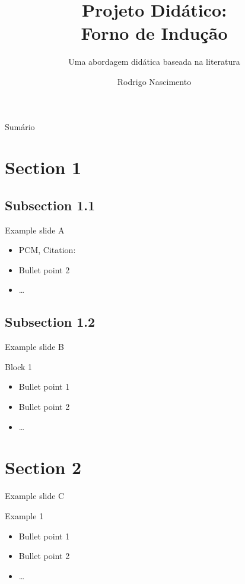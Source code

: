 \documentclass[18pt]{beamer}
\title[Short title]{Projeto Didático:\\ Forno de Indução}
\subtitle{Uma abordagem didática baseada na literatura}
\author{Rodrigo Nascimento}
\institute{Instrumentação para o Ensino de Física II}
\begin{document}

	\begin{frame}
		\titlepage
	\end{frame}

	\begin{frame}{Sumário}
		\tableofcontents
	\end{frame}

	\section{Section 1}
	\subsection{Subsection 1.1}
	\begin{frame}{Example slide A}
		\begin{itemize}
			\item PCM, Citation: \cite{becker2008a} %
			\pause
			\item Bullet point 2
			\item \dots
		\end{itemize}
	\end{frame}

	\subsection{Subsection 1.2}
	\begin{frame}{Example slide B}
		\begin{block}{Block 1}
			\begin{itemize}
				\item Bullet point 1
				\pause
				\item Bullet point 2
				\item \dots
			\end{itemize}
		\end{block}
	\end{frame}

	\section{Section 2}
	\begin{frame}{Example slide C}
		\begin{exampleblock}{Example 1}
			\begin{itemize}
				\item Bullet point 1
				\pause
				\item Bullet point 2
				\item \dots
			\end{itemize}
		\end{exampleblock}
	\end{frame}
\end{document}
